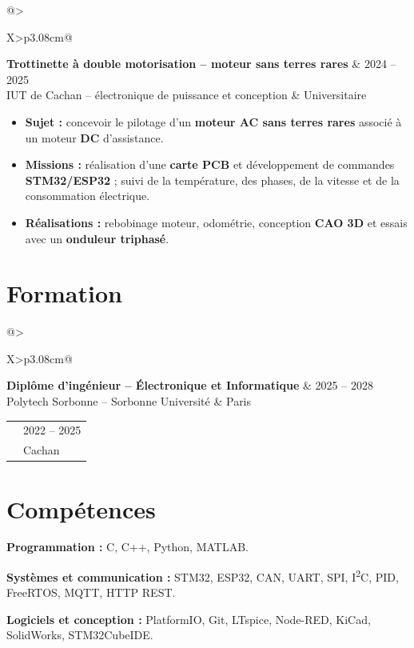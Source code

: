 \documentclass[9pt,a4paper]{extarticle}
\makeatletter
\newcommand{\entry}[4]{%
\begin{tabularx}{\linewidth}{@{}>{\raggedright\arraybackslash}X>{\raggedleft\arraybackslash}p{3.08cm}@{}}
 {\bfseries\color{bleu}#1} & {\fontsize{8.5}{9.3}\selectfont\color{secondaire}#2} \\[-2pt]
 {\fontsize{8.5}{9.6}\selectfont\color{secondaire}#3} & {\fontsize{8.5}{9.3}\selectfont\color{secondaire}#4}
\end{tabularx}\vspace{-3.4pt}\par}
\newcommand{\gapentry}{\vspace{3.0pt}}
\newcommand{\comp}[2]{\textbf{\color{bleu}#1} \hspace{2pt} #2\par}
\makeatother
\begin{document}
\gapentry
\entry{Trottinette à double motorisation -- moteur sans terres rares}{2024 -- 2025}{IUT de Cachan -- électronique de puissance et conception}{Universitaire}
\begin{itemize}
  \item \textbf{Sujet :} concevoir le pilotage d'un \textbf{moteur AC sans terres rares} associé à un moteur \textbf{DC} d'assistance.
  \item \textbf{Missions :} réalisation d'une \textbf{carte PCB} et développement de commandes \textbf{STM32/ESP32} ; suivi de la température, des phases, de la vitesse et de la consommation électrique.
  \item \textbf{Réalisations :} rebobinage moteur, odométrie, conception \textbf{CAO 3D} et essais avec un \textbf{onduleur triphasé}.
\end{itemize}

\section{Formation}
\entry{Diplôme d'ingénieur -- Électronique et Informatique}{2025 -- 2028}{Polytech Sorbonne -- Sorbonne Université}{Paris}
\vspace{1pt}
\entry{BUT Génie électrique et informatique industrielle -- option Électricité et maîtrise de l'énergie}{2022 -- 2025}{IUT de Cachan -- Université Paris-Saclay}{Cachan}

\section{Compétences}
{\fontsize{8.65}{10.05}\selectfont
\comp{Programmation :}{C, C++, Python, MATLAB.}
\comp{Systèmes et communication :}{STM32, ESP32, CAN, UART, SPI, I\textsuperscript{2}C, PID, FreeRTOS, MQTT, HTTP REST.}
\comp{Logiciels et conception :}{PlatformIO, Git, LTspice, Node-RED, KiCad, SolidWorks, STM32CubeIDE.}
}
\end{document}
